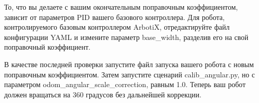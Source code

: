 То, что вы делаете с вашим окончательным поправочным коэффициентом, зависит от параметров PID вашего базового контроллера. Для робота, контролируемого базовым контроллером ArbotiX, отредактируйте файл конфигурации YAML и измените параметр base\_width, разделив его на свой поправочный коэффициент.

В качестве последней проверки запустите файл запуска вашего робота с новым поправочным коэффициентом. Затем запустите сценарий calib\_angular.py, но с параметром odom\_angular\_scale\_correction, равным 1.0. Теперь ваш робот должен вращаться на 360 градусов без дальнейшей коррекции.

